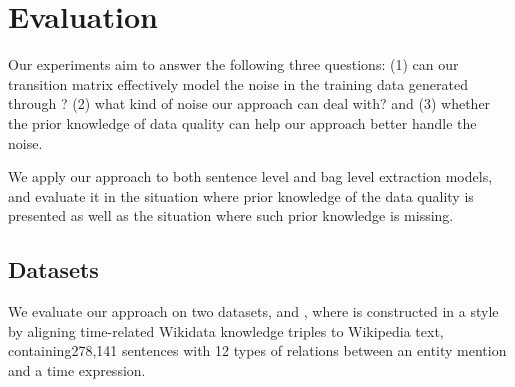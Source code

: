\section{Evaluation}

Our experiments aim to answer the following three questions: (1) can our
transition matrix effectively model the noise in the training data generated
through \DS? (2) what kind of noise our approach can deal with? and (3)
whether the prior knowledge of data quality can help our approach better
handle the noise.

We apply our approach to both sentence level and bag level
extraction models, and evaluate it in the situation where prior knowledge of
the data quality is presented as well as the situation where such prior  
knowledge is missing.


\subsection{Datasets}
We evaluate our approach on two datasets, \TimeRE and \EntityRE,  %
where \TimeRE is constructed 
in a \DS style by aligning time-related Wikidata knowledge triples to
Wikipedia text, containing278,141 sentences with 12
types of relations  between an entity mention and a time expression. 

